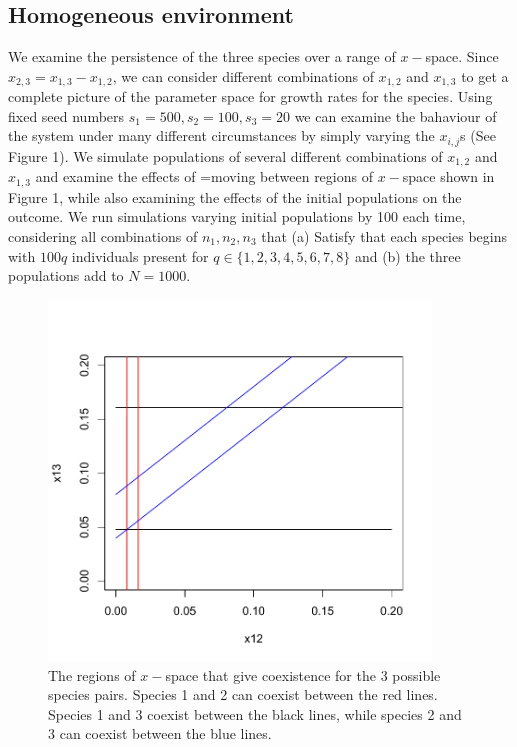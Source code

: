 \subsection{Homogeneous environment}
We examine the persistence of the three species over a range of $x-$space. Since $x_{2,3}=x_{1,3}-x_{1,2}$, we can consider different combinations of 
$x_{1,2}$ and $x_{1,3}$ to get a complete picture of the parameter space for growth rates for the species. Using fixed seed numbers $s_1=500,s_2=100,s_3=20$ we can examine the bahaviour of the system under many different circumstances by simply varying the $x_{i,j}$s (See Figure 1). We simulate populations of several different combinations of $x_{1,2}$ and $x_{1,3}$ and examine the effects of =moving between regions of $x-$space shown in Figure 1, while also examining the effects of the initial populations on the outcome. We run simulations varying initial populations by 100 each time, considering all combinations of $n_1,n_2,n_3$ that (a) Satisfy that each species begins with $100q$ individuals present for $q \in \{1,2,3,4,5,6,7,8\}$ and (b) the three populations add to $N=1000$. 
\begin{figure}[htbp]
\begin{center}
\includegraphics[width=4in]{3dxchoices.pdf}
\caption{The regions of $x-$space that give coexistence for the 3 possible species pairs. Species 1 and 2 can coexist between the red lines. Species 1 and 3 coexist between the black lines, while species 2 and 3 can coexist between the blue lines.}
\label{default}
\end{center}
\end{figure}
